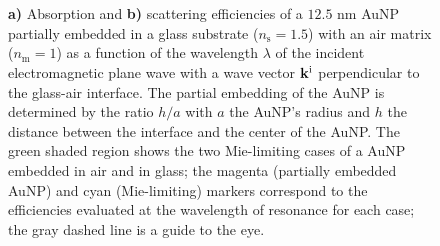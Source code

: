 \begin{figure}[h!]
    \def\svgwidth{\textwidth}
    \small
     \\[-15em]
    \hspace*{-.375\textwidth}%
        \begin{subfigure}{.765\textwidth}\caption{ }\label{sfig:IncNormal:1}\end{subfigure}%
        \begin{subfigure}{.25\textwidth}\caption{ }\label{sfig:IncNormal:2}\end{subfigure}\\[11.5em]
    \caption[Absorption and Scattering Efficiencies of a partially embedded 12.5 nm AuNP into a substrate Illuminated in an internal configuration at normal incidence]{\textbf{a)} Absorption and \textbf{b)} scattering efficiencies of a $12.5$ nm AuNP partially embedded in a glass substrate ($n_\text{s} = 1.5$) with an air matrix ($n_\text{m} = 1$) as a function of the wavelength $\lambda$ of the incident electromagnetic plane wave with a wave vector $\vb{k}^\text{i}$ perpendicular to the glass-air interface. The partial embedding of the AuNP is determined by the ratio $h/a$ with $a$ the AuNP's radius and $h$ the distance between the interface and the center of the AuNP. The green shaded region shows the two Mie-limiting cases of a AuNP embedded in air and in glass; the magenta (partially embedded AuNP) and cyan (Mie-limiting) markers correspond to the efficiencies evaluated at the wavelength of resonance for each case; the gray dashed line is a guide to the eye.}
    \label{fig:Inc:Eff}
\end{figure}

